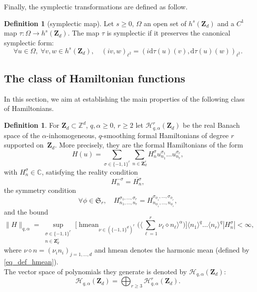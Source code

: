\documentclass[11pt]{article}
\theoremstyle{definition}
\newtheorem{definition}[theorem]{Definition}
\begin{document}
Finally, the symplectic transformations are defined as follow.
\begin{definition}[symplectic map]
\label{def_symplectic} Let $s\geq 0$, $\Omega$ an open set of $h^s(\mathbf{Z}_d)$ and a $C^1$ map $\tau: \Omega \to h^s(\mathbf{Z}_d) $. The map $\tau$ is symplectic if it preserves the canonical symplectic form:
\[
\forall u \in \Omega,\; \forall v,w \in h^s(\mathbf{Z}_d), \quad (iv,w)_{\ell^2} = (i\mathrm{d}\tau(u)(v),\mathrm{d}\tau(u)(w))_{\ell^2}.
\]
\end{definition}

\subsection{The class of Hamiltonian functions}
In this section, we aim at establishing the main properties of the following class of Hamiltonians.
\begin{definition}
\label{def_class_ham} For $\mathbf{Z}_d\subset \mathbb{Z}^d$, $q,\alpha\geq 0$, $r\geq 2$ let $\mathscr{H}_{q,\alpha}^{r}(\mathbf{Z}_d)$ be the real Banach space of the $\alpha$-inhomogeneous, $q$-smoothing formal Hamiltonians of degree $r$ supported on~$\mathbf{Z}_d$. More precisely, they are the formal Hamiltonians of the form
\[
H(u) = \sum_{\sigma \in \{-1,1\}^r} \sum_{n\in \mathbf{Z}_d^r } H_{n}^{\sigma} u_{n_1}^{\sigma_1} \dots u_{n_r}^{\sigma_r},
\]
with $H_{n}^{\sigma} \in \mathbb{C}$, satisfying the reality condition
\begin{equation}
\label{eq_def_real}
H_{n}^{-\sigma} = \overline{H_{n}^{\sigma}},
\end{equation}
the symmetry condition\vspace*{-3pt}
\begin{equation}
\label{def_sym_cond}
\forall \phi \in \mathfrak{S}_r, \quad H_{n_1,\dots,n_r}^{\sigma_1,\dots,\sigma_r} = H_{n_{\phi_1},\dots,n_{\phi_r}}^{\sigma_{\phi_1},\dots,\sigma_{\phi_r}},
\end{equation}
and the bound\vspace*{-3pt}
\begin{equation}
\label{eq_norm_ham}
\| H \|_{q,\alpha} = \! \! \! \sup_{\substack{\sigma \in \{-1,1\}^r\\ n\in \mathbf{Z}_d^r }}
\biggl[\mathop{\mathrm{hmean}}_{\nu \in (\{-1,1\}^d)^r} \Big(\Big\langle \sum_{\ell =1}^r \nu_{\ell} \diamond n_{\ell} \Big\rangle^{\alpha} \Big) \biggr] \langle n_1 \rangle^q \dots \langle n_r \rangle^q | H_{n}^{\sigma} | < \infty,
\end{equation}
where $\nu \diamond n =(\nu_i n_i)_{j=1,\dots,d}$ and $\mathrm{hmean}$ denotes the harmonic mean (defined by \eqref{eq_def_hmean}).\\
The vector space of polynomials they generate is denoted by $\mathscr{H}_{q,\alpha}(\mathbf{Z}_d)$:
\[
\mathscr{H}_{q,\alpha}(\mathbf{Z}_d) = \bigoplus_{r \geq 3} \mathscr{H}_{q,\alpha}^{r}(\mathbf{Z}_d).
\]
\end{definition}
\end{document}
